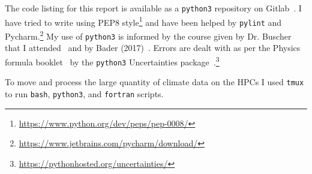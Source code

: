 \documentclass[../main.tex]{subfiles}
\begin{document}
 The code listing for this report is available as a \texttt{python3} repository on Gitlab~\cite{gitlab}.
  I have tried to write using PEP8 style\footnote{\href{https://www.python.org/dev/peps/pep-0008/}{https://www.python.org/dev/peps/pep-0008/}}
  and have been helped by \texttt{pylint} and Pycharm.\footnote{\href{https://www.jetbrains.com/pycharm/download/}{https://www.jetbrains.com/pycharm/download/}}
  My use of \texttt{python3} is informed by the course given by Dr. Buscher that I attended~\cite{SciCompNotes}
  and by Bader (2017)~\cite{bader2017python}.
   Errors are dealt with as per the Physics formula booklet~\cite{MathsFormulaBooklet} by the \texttt{python3} Uncertainties package~\cite{lebigot2010uncertainties}.\footnote{\href{https://pythonhosted.org/uncertainties/}{https://pythonhosted.org/uncertainties/}}

 To move and process the large quantity of climate data on the HPCs I used \texttt{tmux}
 to run \texttt{bash}, \texttt{python3}, and \texttt{fortran} scripts.
\end{document}
